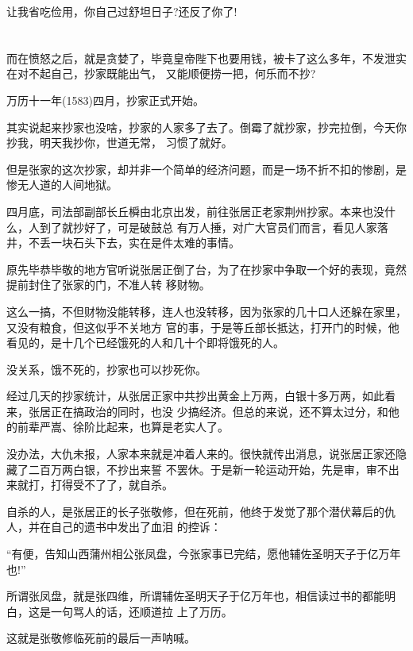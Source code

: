 \documentclass[11pt,a4paper,onecolumn]{article}
\begin{document}
让我省吃俭用，你自己过舒坦日子?还反了你了!

\section[\thesection]{}

而在愤怒之后，就是贪婪了，毕竟皇帝陛下也要用钱，被卡了这么多年，不发泄实在对不起自己，抄家既能出气，
又能顺便捞一把，何乐而不抄?

万历十一年(1583)四月，抄家正式开始。

其实说起来抄家也没啥，抄家的人家多了去了。倒霉了就抄家，抄完拉倒，今天你抄我，明天我抄你，世道无常，
习惯了就好。

但是张家的这次抄家，却并非一个简单的经济问题，而是一场不折不扣的惨剧，是惨无人道的人间地狱。

四月底，司法部副部长丘橓由北京出发，前往张居正老家荆州抄家。本来也没什么，人到了就抄好了，可是破鼓总
有万人捶，对广大官员们而言，看见人家落井，不丢一块石头下去，实在是件太难的事情。

原先毕恭毕敬的地方官听说张居正倒了台，为了在抄家中争取一个好的表现，竟然提前封住了张家的门，不准人转
移财物。

这么一搞，不但财物没能转移，连人也没转移，因为张家的几十口人还躲在家里，又没有粮食，但这似乎不关地方
官的事，于是等丘部长抵达，打开门的时候，他看见的，是十几个已经饿死的人和几十个即将饿死的人。

没关系，饿不死的，抄家也可以抄死你。

经过几天的抄家统计，从张居正家中共抄出黄金上万两，白银十多万两，如此看来，张居正在搞政治的同时，也没
少搞经济。但总的来说，还不算太过分，和他的前辈严嵩、徐阶比起来，也算是老实人了。

没办法，大仇未报，人家本来就是冲着人来的。很快就传出消息，说张居正家还隐藏了二百万两白银，不抄出来誓
不罢休。于是新一轮运动开始，先是审，审不出来就打，打得受不了了，就自杀。

自杀的人，是张居正的长子张敬修，但在死前，他终于发觉了那个潜伏幕后的仇人，并在自己的遗书中发出了血泪
的控诉：

``有便，告知山西蒲州相公张凤盘，今张家事已完结，愿他辅佐圣明天子于亿万年也!''

所谓张凤盘，就是张四维，所谓辅佐圣明天子于亿万年也，相信读过书的都能明白，这是一句骂人的话，还顺道拉
上了万历。

这就是张敬修临死前的最后一声呐喊。

\section[\thesection]{}
\end{document}
